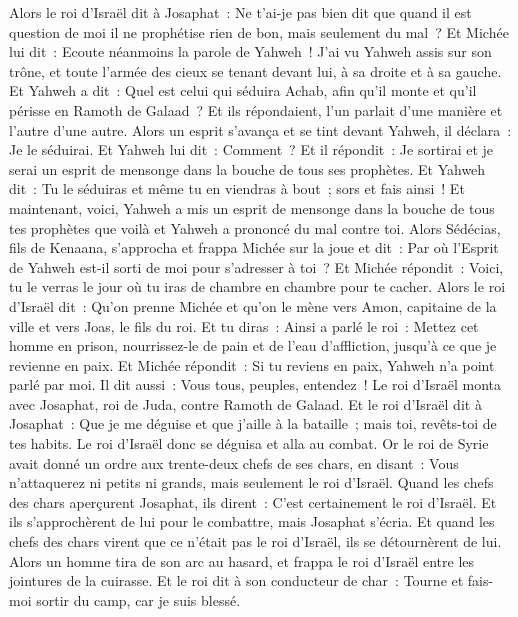 \begin{multicols}{2}
Alors le roi d'Israël dit à Josaphat~: Ne t'ai-je pas bien dit que quand il est question de moi il ne prophétise rien de bon, mais seulement du mal~?
Et Michée lui dit~: Ecoute néanmoins la parole de Yahweh~! J'ai vu Yahweh assis sur son trône, et toute l'armée des cieux se tenant devant lui, à sa droite et à sa gauche.
Et Yahweh a dit~: Quel est celui qui séduira Achab, afin qu'il monte et qu'il périsse en Ramoth de Galaad~? Et ils répondaient, l'un parlait d'une manière et l'autre d'une autre.
Alors un esprit s'avança et se tint devant Yahweh, il déclara~: Je le séduirai. Et Yahweh lui dit~: Comment~?
Et il répondit~: Je sortirai et je serai un esprit de mensonge dans la bouche de tous ses prophètes. Et Yahweh dit~: Tu le séduiras et même tu en viendras à bout~; sors et fais ainsi~!
Et maintenant, voici, Yahweh a mis un esprit de mensonge dans la bouche de tous tes prophètes que voilà et Yahweh a prononcé du mal contre toi.
Alors Sédécias, fils de Kenaana, s'approcha et frappa Michée sur la joue et dit~: Par où l'Esprit de Yahweh est-il sorti de moi pour s'adresser à toi~?
Et Michée répondit~: Voici, tu le verras le jour où tu iras de chambre en chambre pour te cacher.
Alors le roi d'Israël dit~: Qu'on prenne Michée et qu'on le mène vers Amon, capitaine de la ville et vers Joas, le fils du roi.
Et tu diras~: Ainsi a parlé le roi~: Mettez cet homme en prison, nourrissez-le de pain et de l'eau d'affliction, jusqu'à ce que je revienne en paix.
Et Michée répondit~: Si tu reviens en paix, Yahweh n'a point parlé par moi. Il dit aussi~: Vous tous, peuples, entendez~!
Le roi d'Israël monta avec Josaphat, roi de Juda, contre Ramoth de Galaad.
Et le roi d'Israël dit à Josaphat~: Que je me déguise et que j'aille à la bataille~; mais toi, revêts-toi de tes habits. Le roi d'Israël donc se déguisa et alla au combat.
Or le roi de Syrie avait donné un ordre aux trente-deux chefs de ses chars, en disant~: Vous n'attaquerez ni petits ni grands, mais seulement le roi d'Israël.
Quand les chefs des chars aperçurent Josaphat, ils dirent~: C'est certainement le roi d'Israël. Et ils s'approchèrent de lui pour le combattre, mais Josaphat s'écria.
Et quand les chefs des chars virent que ce n'était pas le roi d'Israël, ils se détournèrent de lui.
Alors un homme tira de son arc au hasard, et frappa le roi d'Israël entre les jointures de la cuirasse. Et le roi dit à son conducteur de char~: Tourne et fais-moi sortir du camp, car je suis blessé.

\end{multicols}
